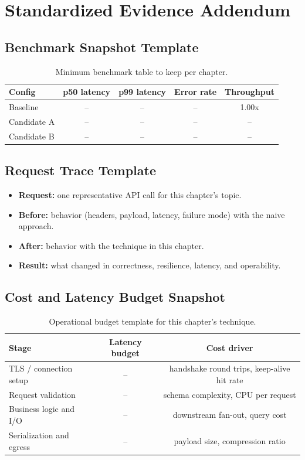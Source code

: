 \section{Standardized Evidence Addendum}
\subsection{Benchmark Snapshot Template}
\begin{table}[h]
  \centering
  \small
  \begin{tabularx}{\textwidth}{l c c c c}
    \toprule
    \textbf{Config} & \textbf{p50 latency} & \textbf{p99 latency} & \textbf{Error rate} & \textbf{Throughput} \\
    \midrule
    Baseline & -- & -- & -- & 1.00x \\
    Candidate A & -- & -- & -- & -- \\
    Candidate B & -- & -- & -- & -- \\
    \bottomrule
  \end{tabularx}
  \caption{Minimum benchmark table to keep per chapter.}
\end{table}

\subsection{Request Trace Template}
\begin{itemize}
  \item \textbf{Request:} one representative API call for this chapter's topic.
  \item \textbf{Before:} behavior (headers, payload, latency, failure mode) with the naive approach.
  \item \textbf{After:} behavior with the technique in this chapter.
  \item \textbf{Result:} what changed in correctness, resilience, latency, and operability.
\end{itemize}

\subsection{Cost and Latency Budget Snapshot}
\begin{table}[h]
  \centering
  \small
  \begin{tabularx}{\textwidth}{l c c}
    \toprule
    \textbf{Stage} & \textbf{Latency budget} & \textbf{Cost driver} \\
    \midrule
    TLS / connection setup & -- & handshake round trips, keep-alive hit rate \\
    Request validation & -- & schema complexity, CPU per request \\
    Business logic and I/O & -- & downstream fan-out, query cost \\
    Serialization and egress & -- & payload size, compression ratio \\
    \bottomrule
  \end{tabularx}
  \caption{Operational budget template for this chapter's technique.}
\end{table}


